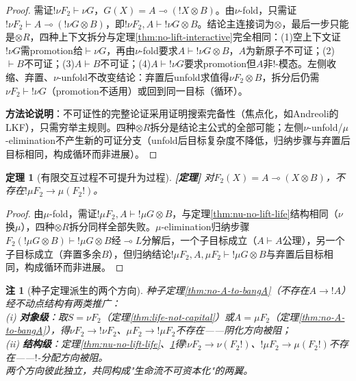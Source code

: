 \documentclass[11pt,a4paper]{article}
\newtheorem{theorem}{定理}
\newtheorem{remark}{注}
\newcommand{\lvl}[1]{\hfill\textbf{\footnotesize[#1]}}
\newcommand{\lvP}{\lvl{定理}}
\newcommand{\lolli}{\multimap}
\newcommand{\bang}{{!}}
\newcommand{\tensor}{\otimes}
\begin{document}
\begin{proof}
需证$\bang\nu F_2\vdash\nu G$，$G(X)=A\lolli(\bang X\tensor B)$。由$\nu$-fold，只需证$\bang\nu F_2\vdash A\lolli(\bang\nu G\tensor B)$，即$\bang\nu F_2,A\vdash\bang\nu G\tensor B$。结论主连接词为$\tensor$，最后一步只能是$\tensor R$，四种上下文拆分与定理\ref{thm:no-lift-interactive}完全相同：(1)空上下文证$\bang\nu G$需promotion给$\vdash\nu G$，再由$\nu$-fold要求$A\vdash\bang\nu G\tensor B$，$A$为新原子不可证；(2)$\vdash B$不可证；(3)$A\vdash B$不可证；(4)$A\vdash\bang\nu G$要求promotion但$A$非$\bang$-模态。左侧收缩、弃置、$\nu$-unfold不改变结论：弃置后unfold求值得$\nu F_2\tensor B$，拆分后仍需$\nu F_2\vdash\bang\nu G$（promotion不适用）或回到同一目标（循环）。

\textbf{方法论说明}：不可证性的完整论证采用证明搜索完备性（焦点化，如Andreoli的LKF），只需穷举主规则。四种$\tensor R$拆分是结论主公式的全部可能；左侧$\nu$-unfold/$\mu$-elimination不产生新的可证分支（unfold后目标复杂度不降低，归纳步骤与弃置后目标相同，构成循环而非进展）。
\end{proof}

\begin{theorem}[有限交互过程不可提升为过程]\label{thm:mu-no-lift}\lvP
对$F_2(X)=A\lolli(X\tensor B)$，不存在$\bang\mu F_2\to\mu(F_2\bang)$。
\end{theorem}

\begin{proof}
由$\mu$-fold，需证$\bang\mu F_2,A\vdash\bang\mu G\tensor B$，与定理\ref{thm:nu-no-lift-life}结构相同（$\nu$换$\mu$），四种$\tensor R$拆分同样全部失败。$\mu$-elimination归纳步骤$F_2(\bang\mu G\tensor B)\vdash\bang\mu G\tensor B$经$\lolli L$分解后，一个子目标成立（$A\vdash A$公理），另一个子目标成立（弃置多余$B$），但归纳结论$\bang\mu F_2,A,\mu F_2\vdash\bang\mu G\tensor B$与弃置后目标相同，构成循环而非进展。
\end{proof}

\begin{remark}[种子定理派生的两个方向]
种子定理\ref{thm:no-A-to-bangA}（不存在$A\to\bang A$）经不动点结构有两类推广：\\
(i) \textbf{对象级}：取$S=\nu F_2$（定理\ref{thm:life-not-capital}）或$A=\mu F_2$（定理\ref{thm:no-A-to-bangA}），得$\nu F_2\to\bang\nu F_2$、$\mu F_2\to\bang\mu F_2$不存在——阴化方向被阻；\\
(ii) \textbf{结构级}：定理\ref{thm:nu-no-lift-life}、\ref{thm:mu-no-lift}得$\bang\nu F_2\to\nu(F_2\bang)$、$\bang\mu F_2\to\mu(F_2\bang)$不存在——$\bang$-分配方向被阻。\\
两个方向彼此独立，共同构成"生命流不可资本化"的两翼。
\end{remark}
\end{document}
